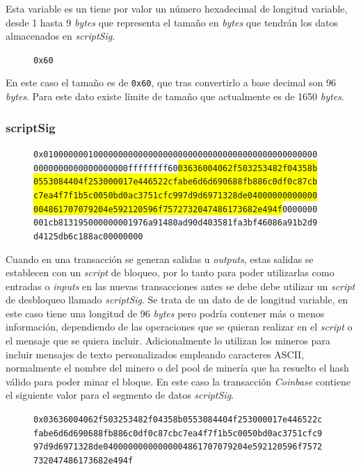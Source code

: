 \documentclass{article}
\begin{document}
    Esta variable es un tiene por valor un número hexadecimal de longitud variable, desde 1 hasta 9 \textit{bytes} que representa el tamaño en \textit{bytes} que tendrán los datos almacenados en \textit{scriptSig}.
    \begin{figure}[H]
        \texttt{0x60}
    \end{figure}
    En este caso el tamaño es de \texttt{0x60}, que tras convertirlo a base decimal son 96 \textit{bytes}. Para este dato existe límite de tamaño que actualmente es de 1650 \textit{bytes}.
    
    \subsubsection{scriptSig}
    
    \begin{figure}[H]
        \texttt{0x0100000001000000000000000000000000000000000000000000000} \\
        \texttt{0000000000000000000ffffffff60\colorbox{Yellow}{03636004062f503253482f04358b}} \\
        \texttt{\colorbox{Yellow}{0553084404f253000017e446522cfabe6d6d690688fb886c0df0c87cb}} \\
        \texttt{\colorbox{Yellow}{c7ea4f7f1b5c0050bd0ac3751cfc997d9d6971328de04000000000000}} \\
        \texttt{\colorbox{Yellow}{004861707079204e592120596f7572732047486173682e494f}0000000} \\
        \texttt{001cb813195000000001976a91480ad90d403581fa3bf46086a91b2d9} \\
        \texttt{d4125db6c188ac00000000}
    \end{figure}
    
    Cuando en una transacción se generan salidas u \textit{outputs}, estas salidas se establecen con un \textit{script} de bloqueo, por lo tanto para poder utilizarlas como entradas o \textit{inputs} en las nuevas transacciones antes se debe debe utilizar un \textit{script} de desbloqueo llamado \textit{scriptSig}. Se trata de un dato de de longitud variable, en este caso tiene una longitud de 96 \textit{bytes} pero podría contener más o menos información, dependiendo de las operaciones que se quieran realizar en el \textit{script} o el mensaje que se quiera incluir. Adicionalmente lo utilizan los mineros para incluir mensajes de texto personalizados empleando caracteres ASCII, normalmente el nombre del minero o del pool de minería que ha resuelto el hash válido para poder minar el bloque. En este caso la transacción \textit{Coinbase} contiene el siguiente valor para el segmento de datos \textit{scriptSig}.
    \begin{figure}[H]
        \texttt{0x03636004062f503253482f04358b0553084404f253000017e446522c} \\
        \texttt{fabe6d6d690688fb886c0df0c87cbc7ea4f7f1b5c0050bd0ac3751cfc9}
        \texttt{97d9d6971328de04000000000000004861707079204e592120596f7572}
        \texttt{732047486173682e494f}
        
    \end{figure}
    
\end{document}
